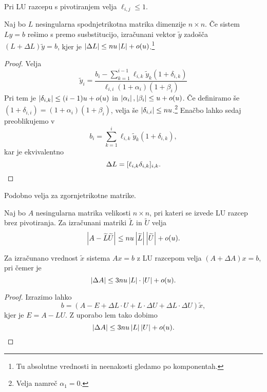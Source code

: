 \begin{opomba}
Pri LU razcepu s pivotiranjem velja $\ell_{i,j} \leq 1$.
\end{opomba}

\begin{lema}
Naj bo $L$ nesingularna spodnjetrikotna matrika dimenzije
$n \times n$. Če sistem $Ly = b$ rešimo s premo susbstitucijo,
izračunani vektor $\tilde{y}$ zadošča
$(L + \Delta L) \tilde{y} = b$, kjer je
$\left\lvert \Delta L\right\rvert \leq nu \left\lvert L\right\rvert + o(u)$.\footnote{Tu absolutne
vrednosti in neenakosti gledamo po komponentah.}
\end{lema}

\begin{proof}
Velja
\[
\tilde{y}_i =
\frac{\displaystyle b_i -
\sum_{k=1}^{i-1} \ell_{i,k} \tilde{y}_k (1 + \delta_{i,k})}
{\ell_{i,i} (1 + \alpha_i) (1 + \beta_i)}
\]
Pri tem je $\left\lvert \delta_{i,k}\right\rvert \leq (i-1) u + o(u)$ in
$\left\lvert \alpha_i\right\rvert, \left\lvert \beta_i\right\rvert \leq u + o(u)$. Če definiramo še
$(1 + \delta_{i,i}) = (1 + \alpha_i) (1 + \beta_i)$, velja še
$\left\lvert \delta_{i,i}\right\rvert \leq nu$.\footnote{Velja namreč
$\alpha_1 = 0$.} Enačbo lahko sedaj preoblikujemo v
\[
b_i = \sum_{k=1}^i \ell_{i,k} \tilde{y}_k (1 + \delta_{i,k}),
\]
kar je ekvivalentno
\[
\Delta L = [\ell_{i,k} \delta_{i,k}]_{i,k}. \qedhere
\]
\end{proof}

\begin{opomba}
Podobno velja za zgornjetrikotne matrike.
\end{opomba}

\begin{lema}
Naj bo $A$ nesingularna matrika velikosti $n \times n$, pri kateri
se izvede LU razcep brez pivotiranja. Za izračunani matriki
$\widetilde{L}$ in $\widetilde{U}$ velja
\[
\left\lvert A - \widetilde{L} \widetilde{U}\right\rvert \leq
n u \left\lvert \widetilde{L}\right\rvert \left\lvert \widetilde{U}\right\rvert + o(u).
\]
\end{lema}

\begin{izrek}
Za izračunano vrednost $\tilde{x}$ sistema $Ax = b$ z LU razcepom
velja $(A + \Delta A)x = b$, pri čemer je
\[
\left\lvert \Delta A\right\rvert \leq 3 n u \left\lvert L\right\rvert \cdot \left\lvert U\right\rvert + o(u).
\]
\end{izrek}

\begin{proof}
Izrazimo lahko
\[
b = (A - E + \Delta L \cdot U + L \cdot \Delta U +
\Delta L \cdot \Delta U) \tilde{x},
\]
kjer je $E = A - LU$. Z uporabo lem tako dobimo
\[
\left\lvert \Delta A\right\rvert \leq 3 nu \left\lvert L\right\rvert \left\lvert U\right\rvert + o(u). \qedhere
\]
\end{proof}

